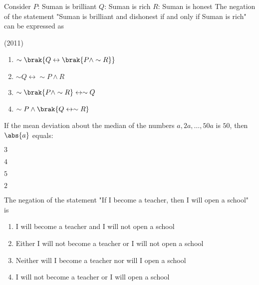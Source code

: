     \item Consider \newline
    $P$: Suman is brilliant\newline
    $Q$: Suman is rich\newline
    $R$: Suman is honest\newline
    The negation of the statement "Suman is brilliant and dishonest if and only if Suman is rich" can be expressed as
    
    \hfill{(2011)}
    \begin{enumerate}
    \item $\sim \brak{Q \leftrightarrow \brak{P \land \sim R}}$
    \item $\sim Q \leftrightarrow \sim P \land R$
    \item $\sim \brak{P \land \sim R} \leftrightarrow \sim Q$
    \item $\sim P \land \brak{Q \leftrightarrow \sim R}$
    \end{enumerate}
    
    \item If the mean deviation about the median of the numbers $a, 2a, \dots, 50a$ is $50$, then $\abs{a}$ equals:
    
    \hfill{}
    \begin{enumerate}
    \begin{multicols}{4}
        \item $3$
        \item $4$
        \item $5$
        \item $2$
    \end{multicols}
    \end{enumerate}
    
    \item The negation of the statement\newline
    "If I become a teacher, then I will open a school" is
    
    \hfill{}
    \begin{enumerate}
        \item I will become a teacher and I will not open a school
        \item Either I will not become a teacher or I will not open a school
        \item Neither will I become a teacher nor will I open a school
        \item I will not become a teacher or I will open a school
    \end{enumerate}
    
